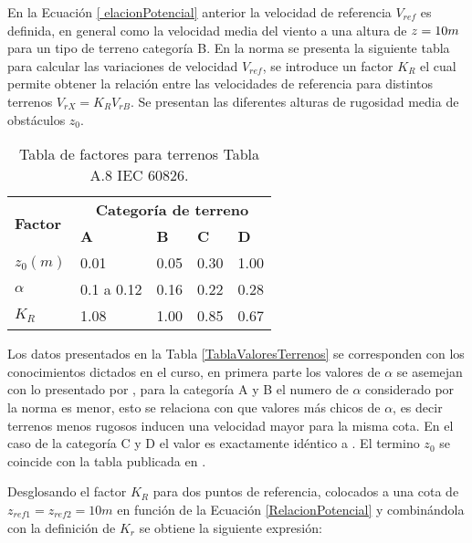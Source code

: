 En la Ecuación \ref{ elacionPotencial} anterior la velocidad de referencia $V_{ref}$ es definida, en general como la velocidad media del viento a una altura de $z=10\vspace{.1cm}m$ para un tipo de terreno categoría B. En la norma se presenta la siguiente tabla para calcular las variaciones de velocidad $V_{ref}$, se introduce un factor $K_R$ el cual permite obtener la relación entre las velocidades de referencia para distintos terrenos $V_{rX}=K_RV_{rB}$. Se presentan las diferentes alturas de rugosidad media de obstáculos $z_0$.


\begin{table}[h] 
	\begin{footnotesize} 
		\begin{center} 
			\begin{tabular}{ |p{3cm}|p{2cm}|p{2cm}|p{2cm}|p{2cm}|} \hline
				\multirow{2}{*}{\textbf{Factor}}  & \multicolumn{4}{|c|}{ \textbf{Categoría de terreno} }  \\ 
				& \textbf{A}& \textbf{B} &\textbf{C}&\textbf{D}\\
				\hline
				$z_0(m)$   & 0.01    &0.05&  0.30 & 1.00\\ \hline
				$\alpha$& 0.1 a 0.12  & 0.16 & 0.22 &0.28\\ \hline
				$K_R$ & 1.08 &1.00 &0.85&  0.67\\ \hline
			\end{tabular}
		\end{center} 
		\caption{Tabla de factores para terrenos Tabla A.8 IEC 60826.}
	\end{footnotesize} 
	\label{TablaValoresTerrenos} 
\end{table}

Los datos presentados en la Tabla \eqref{TablaValoresTerrenos} se corresponden con los conocimientos dictados en el curso, en primera parte los valores de $\alpha$ se asemejan con lo presentado por \cite{Davenport1960}, para la categoría A y B el numero de $\alpha$ considerado por la norma es menor, esto se relaciona con que valores más chicos de $\alpha$, es decir terrenos menos rugosos inducen una velocidad mayor para la misma cota. En el caso de la categoría C y D el valor es exactamente idéntico a \cite{Davenport1960} . El termino $z_0$ se coincide con la tabla publicada en \cite{Oke2000}.

Desglosando el factor $K_R$ para dos puntos de referencia, colocados a una cota de $z_{ref1}=z_{ref2}=10m$ en función de la Ecuación \eqref{RelacionPotencial} y combinándola con la definición de $K_r$ se obtiene la siguiente expresión: 


